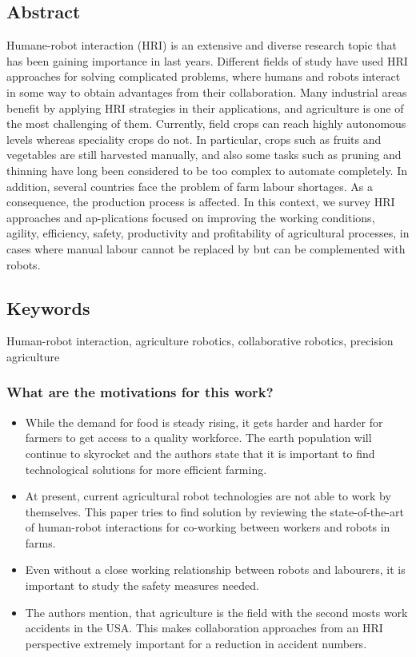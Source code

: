     \subsection*{Abstract}
    Humane-robot interaction (HRI) is an extensive and diverse research topic that has been
    gaining importance in last years. Different fields of study have used HRI approaches for
    solving complicated problems, where humans and robots interact in some way to obtain
    advantages from their collaboration. Many industrial areas benefit by applying HRI strategies in their applications, and agriculture is one of the most challenging of them.
    Currently, field crops can reach highly autonomous levels whereas speciality crops do not.
    In particular, crops such as fruits and vegetables are still harvested manually, and also
    some tasks such as pruning and thinning have long been considered to be too complex to
    automate completely. In addition, several countries face the problem of farm labour
    shortages. As a consequence, the production process is affected. In this context, we survey
    HRI approaches and ap-plications focused on improving the working conditions, agility,
    efficiency, safety, productivity and profitability of agricultural processes, in cases where
    manual labour cannot be replaced by but can be complemented with robots.
    
    \subsection*{Keywords}
    Human-robot interaction, agriculture robotics, collaborative robotics, precision agriculture
    
    
     
    \subsubsection*{What are the motivations for this work?}
    \begin{itemize}
        \item While the demand for food is steady rising, it gets harder and harder for farmers to get access to a quality workforce. The earth population will continue to skyrocket and the authors state that it is important to find technological solutions for more efficient farming.
        \item At present, current agricultural robot technologies are not able to work by themselves. This paper tries to find solution by reviewing the state-of-the-art of human-robot interactions for co-working between workers and robots in farms.
        \item Even without a close working relationship between robots and labourers, it is important to study the safety measures needed. 
        \item The authors mention, that agriculture is the field with the second mosts work accidents in the USA. This makes collaboration approaches from an HRI perspective extremely important for a reduction in accident numbers.
    \end{itemize}
